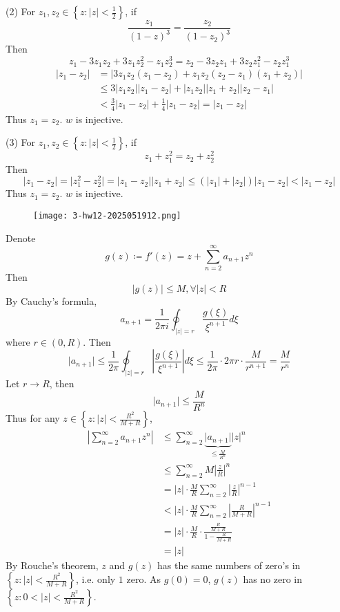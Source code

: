 (2)
For $z_1, z_2\in \left\{  z:\lvert z \rvert<\frac{1}{2}  \right\}$, if
\[
\frac{z_1}{(1-z)^{3}}=\frac{z_2}{(1-z_2)^3}
\]
Then
\[
z_1-3z_1z_2+3z_1z_2^2-z_1z_2^3=z_2-3z_2z_1+3z_2z_1^2-z_2z_1^3
\]
\[
\begin{aligned}
\lvert z_1-z_2 \rvert  & =\lvert 3z_1z_2(z_1-z_2)+z_1z_2(z_2-z_1)(z_1+z_2) \rvert  \\
 & \leq 3\lvert z_1z_2 \rvert \lvert z_1-z_2 \rvert +\lvert z_1z_2 \rvert \lvert z_1+z_2 \rvert \lvert z_2-z_1 \rvert  \\
 & < \frac{3}{4}\lvert z_1-z_2 \rvert +\frac{1}{4}\lvert z_1-z_2 \rvert =\lvert z_1-z_2 \rvert 
\end{aligned}
\]
Thus $z_1=z_2$. $w$ is injective.

(3)
For $z_1, z_2\in \left\{  z:\lvert z \rvert<\frac{1}{2}  \right\}$, if
\[
z_1+z_1^2=z_2+z_2^2
\]
Then
\[
\lvert z_1-z_2 \rvert =\lvert z_1^2-z_2^2 \rvert =\lvert z_1-z_2 \rvert \lvert z_1+z_2 \rvert \leq (\lvert z_1 \rvert +\lvert z_2 \rvert )\lvert z_1-z_2 \rvert <\lvert z_1-z_2 \rvert 
\]
Thus $z_1=z_2$. $w$ is injective.

\begin{exercise}
\begin{figure}[H]
\centering
\texttt{[image: 3-hw12-2025051912.png]}
\label{}
\end{figure}
\end{exercise}
Denote
\[
g(z)\coloneqq f'(z)=z+\sum_{n=2}^{\infty} a_{n+1}z^{n}
\]
Then
\[
\lvert g(z) \rvert \leq M,\forall \lvert z \rvert <R
\]
By Cauchy's formula,
\[
a_{n+1}=\frac{1}{2\pi i}\oint_{\lvert z \rvert =r}\frac{g(\xi)}{\xi^{n+1}}d\xi
\]
where $r\in(0,R)$. Then
\[
\lvert a_{n+1} \rvert \leq \frac{1}{2\pi }\oint_{\lvert z \rvert =r}\left\lvert  \frac{g(\xi)}{\xi^{n+1}}  \right\rvert d\xi\leq \frac{1}{2\pi}\cdot2\pi r \cdot\frac{M}{r^{n+1}}=\frac{M}{r ^{n}}
\]
Let $r\to R$, then
\[
\lvert a_{n+1} \rvert \leq \frac{M}{R^{n}}
\]
Thus for any $z\in \left\{  z:\lvert z \rvert<\frac{R^2}{M+R}  \right\}$,
\[
\begin{aligned}
\left\lvert  \sum_{n=2}^{\infty} a_{n+1}z^{n} \right\rvert & \leq \sum_{n=2}^{\infty} \underbrace{ \lvert a_{n+1} \rvert }_{ \leq \frac{M}{R^{n}} } \lvert z \rvert ^{n}  \\
 & \leq \sum_{n=2}^{\infty} M\left\lvert  \frac{z}{R}  \right\rvert ^{n} \\
 & =\lvert z \rvert \cdot\frac{M}{R}\sum_{n=2}^{\infty} \left\lvert  \frac{z}{R}  \right\rvert ^{n-1} \\
 & <\lvert z \rvert \cdot\frac{M}{R}\sum_{n=2}^{\infty} \left\lvert  \frac{R}{M+R}  \right\rvert ^{n-1}  \\
 & =\lvert z \rvert \cdot \frac{M}{R}\cdot\frac{\frac{R}{M+R}}{1-\frac{R}{M+R}} \\
 & =\lvert z \rvert 
\end{aligned}
\]
By Rouche's theorem, $z$ and $g(z)$ has the same numbers of zero's in $\left\{  z:\lvert z \rvert<\frac{R^2}{M+R}  \right\}$, i.e. only $1$ zero. As $g(0)=0$, $g(z)$ has no zero in $\left\{  z:0<\lvert z \rvert<\frac{R^2}{M+R}  \right\}$.

